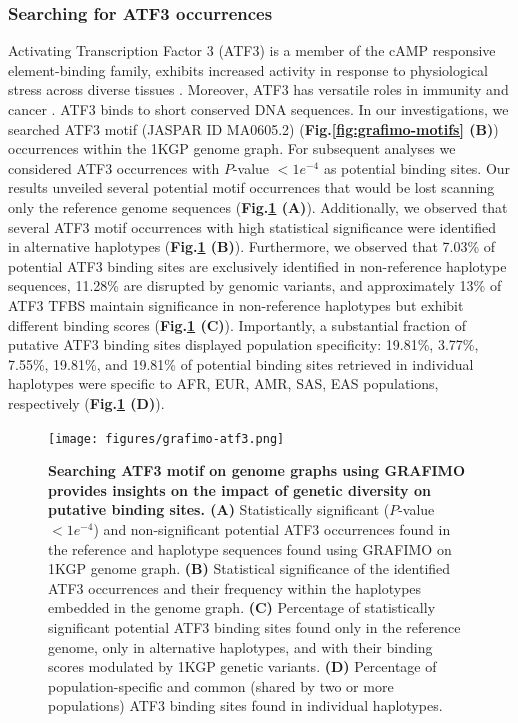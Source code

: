 \documentclass[a4paper, titlepage, openright]{book}
\newcommand{\grafimo}{GRAFIMO\xspace}
\begin{document}
\subsubsection{Searching for ATF3 occurrences}
Activating Transcription Factor 3 (ATF3) is a member of the cAMP responsive element-binding family, exhibits increased activity in response to physiological stress across diverse tissues \citep{chen1996analysis}. Moreover, ATF3 has versatile roles in immunity and cancer \citep{thompson2009atf3}. ATF3 binds to short conserved DNA sequences. In our investigations, we searched ATF3 motif (JASPAR ID MA0605.2) (\textbf{Fig.\ref{fig:grafimo-motifs} (B)}) occurrences within the 1KGP genome graph. For subsequent analyses we considered ATF3 occurrences with $P$-value $< 1e^{-4}$ as potential binding sites. Our results unveiled several potential motif occurrences that would be lost scanning only the reference genome sequences (\textbf{Fig.\ref{fig:grafimo-atf3} (A)}). Additionally, we observed that several ATF3 motif occurrences with high statistical significance were identified in alternative haplotypes (\textbf{Fig.\ref{fig:grafimo-atf3} (B)}). Furthermore, we observed that 7.03\% of potential ATF3 binding sites are exclusively identified in non-reference haplotype sequences, 11.28\% are disrupted by genomic variants, and approximately 13\% of ATF3 TFBS maintain significance in non-reference haplotypes but exhibit different binding scores (\textbf{Fig.\ref{fig:grafimo-atf3} (C)}). Importantly, a substantial fraction of putative ATF3 binding sites displayed population specificity: 19.81\%, 3.77\%, 7.55\%, 19.81\%, and 19.81\% of potential binding sites retrieved in individual haplotypes were specific to AFR, EUR, AMR, SAS, EAS populations, respectively (\textbf{Fig.\ref{fig:grafimo-atf3} (D)}). 

\begin{figure}
    \centering
    \texttt{[image: figures/grafimo-atf3.png]}
    \caption[Searching ATF3 motif on genome graphs using \grafimo provides insights on the impact of genetic diversity on putative binding sites]{\textbf{Searching ATF3 motif on genome graphs using \grafimo provides insights on the impact of genetic diversity on putative binding sites. (A)} Statistically significant ($P$-value $< 1e^{-4}$) and non-significant potential ATF3 occurrences found in the reference and haplotype sequences found using \grafimo on 1KGP genome graph. \textbf{(B)} Statistical significance of the identified ATF3 occurrences and their frequency within the haplotypes embedded in the genome graph. \textbf{(C)} Percentage of statistically significant potential ATF3 binding sites found only in the reference genome, only in alternative haplotypes, and with their binding scores modulated by 1KGP genetic variants. \textbf{(D)} Percentage of population-specific and common (shared by two or more populations) ATF3 binding sites found in individual haplotypes.}
    \label{fig:grafimo-atf3}
\end{figure}
\end{document}
